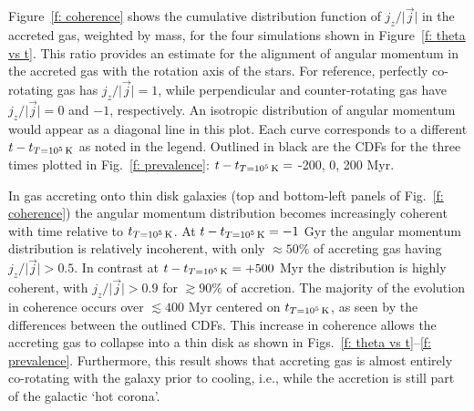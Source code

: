 \documentclass[fleqn,usenatbib]{mnras}
\newcommand{\tcon}{t_{T=10^5\,{\rm K}}}
\begin{document}
Figure~\ref{f: coherence} shows the cumulative distribution function of $j_z / \vert \vec j \vert$ in the accreted gas, weighted by mass, for the four simulations shown in Figure~\ref{f: theta vs t}.
This ratio provides an estimate for the alignment of  angular momentum in the accreted gas with the rotation axis of the stars.
For reference, perfectly co-rotating gas has $j_z / \vert \vec j \vert = 1$, while perpendicular and counter-rotating gas have $j_z / \vert \vec j \vert = 0$ and $-1$, respectively.
An isotropic distribution of angular momentum would appear as a diagonal line in this plot. 
Each curve corresponds to a different $t - \tcon$ as noted in the legend. 
Outlined in black are the CDFs for the three times plotted in Fig.~\ref{f: prevalence}: $t - \tcon =$ -200, 0, 200 Myr.

In gas accreting onto thin disk galaxies (top and bottom-left panels of Fig.~\ref{f: coherence})  the angular momentum distribution becomes increasingly coherent with time relative to $\tcon$.
At $t-\tcon=-1$ Gyr the angular momentum distribution is relatively incoherent, with only $\approx50\%$ of accreting gas having $j_z/\vert \vec j \vert > 0.5$.
In contrast at $t-\tcon=+500$ Myr the distribution is highly coherent, with $j_z/\vert \vec j \vert > 0.9$ for $\gtrsim 90\%$ of accretion.
The majority of the evolution in coherence occurs over $\lesssim 400$ Myr centered on $\tcon$, as seen by the differences between the outlined CDFs.
This increase in coherence allows the accreting gas to collapse into a thin disk as shown in Figs.~\ref{f: theta vs t}--\ref{f: prevalence}.
Furthermore, this result shows that accreting gas is almost entirely co-rotating with the galaxy prior to cooling, i.e., while the accretion is still part of the galactic `hot corona'.

\end{document}
